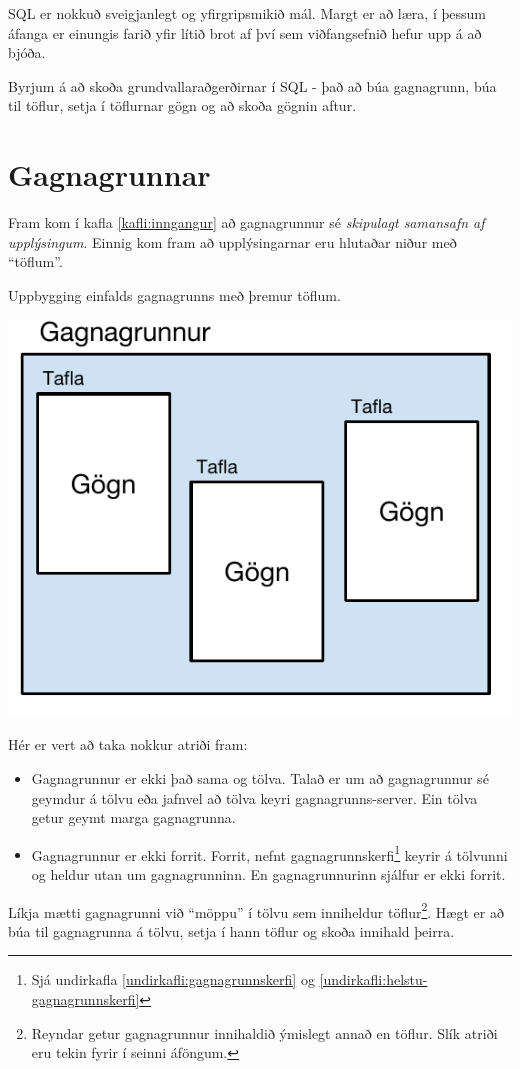 SQL er nokkuð sveigjanlegt og yfirgripsmikið mál. 
Margt er að læra, í þessum áfanga er einungis farið yfir lítið brot af því sem viðfangsefnið hefur upp á að bjóða.

Byrjum á að skoða grundvallaraðgerðirnar í SQL - það að búa gagnagrunn, búa til töflur, setja í töflurnar gögn og að skoða gögnin aftur.
\section{Gagnagrunnar}
Fram kom í kafla \ref{kafli:inngangur} að gagnagrunnur sé \emph{skipulagt samansafn af upplýsingum}. Einnig kom fram að upplýsingarnar eru hlutaðar niður með ``töflum''.
\begin{marginfigure}
\caption[Uppbygging gagnagrunns]{Uppbygging einfalds gagnagrunns með þremur töflum.}
\label{mynd:uppbygging-gagnagrunns}
\centering
\includegraphics[width=\linewidth]{myndir/uppbygging-gagnagrunns}
\end{marginfigure}
Hér er vert að taka nokkur atriði fram:
\begin{itemize}
 \item Gagnagrunnur er ekki það sama og tölva. Talað er um að gagnagrunnur sé geymdur á tölvu eða jafnvel að tölva keyri gagnagrunns-server. Ein tölva getur geymt marga gagnagrunna.
 \item Gagnagrunnur er ekki forrit. Forrit, nefnt gagnagrunnskerfi\footnote{Sjá undirkafla \ref{undirkafli:gagnagrunnskerfi} og \ref{undirkafli:helstu-gagnagrunnskerfi}} keyrir á tölvunni og heldur utan um gagnagrunninn. En gagnagrunnurinn sjálfur er ekki forrit.
\end{itemize}
Líkja mætti gagnagrunni við ``möppu'' í tölvu sem inniheldur töflur\footnote{Reyndar getur gagnagrunnur innihaldið ýmislegt annað en töflur. Slík atriði eru tekin fyrir í seinni áföngum.}. Hægt er að búa til gagnagrunna á tölvu, setja í hann töflur og skoða innihald þeirra.


